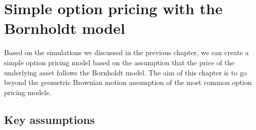 \chapter{Simple option pricing with the Bornholdt model}\label{ch:chapter4}
Based on the simulations we discussed in the previous chapter, we can create a simple option pricing model based on the assumption that the price of the underlying asset follows the Bornholdt model. The aim of this chapter is to go beyond the geometric Brownian motion assumption of the most common option pricing models.

\section{Key assumptions}